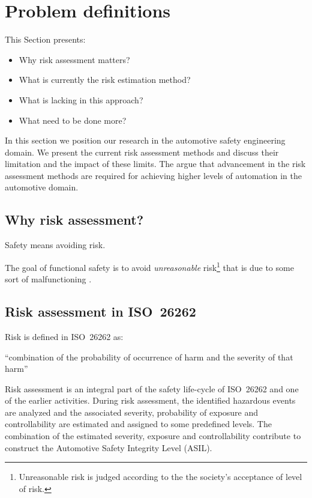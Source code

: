 \section{Problem definitions}
\label{sec:problem} %

This Section presents: 
\begin{itemize}
	\item Why risk assessment matters?
	\item What is currently the risk estimation method? 
	\item What is lacking in this approach? 
	\item What need to be done more? 
\end{itemize}

In this section we position our research in the automotive safety engineering domain. 
We present the current risk assessment methods and discuss their limitation and the impact of these limits.
The argue that advancement in the risk assessment methods are required for achieving higher levels of automation in the automotive domain. 

\subsection{Why risk assessment?}

Safety means avoiding risk. 

The goal of functional safety is to avoid \emph{unreasonable} risk\footnote{Unreasonable risk is judged according to the the society's acceptance of level of risk.} that is due to some sort of malfunctioning .


\subsection{Risk assessment in ISO~26262}
Risk is defined in ISO~26262 as:
\begin{definition}
	``combination of the probability of occurrence of harm and the severity of that harm'' 
\end{definition}



Risk assessment is an integral part of the safety life-cycle of ISO~26262 and one of the earlier activities. 
During risk assessment, the identified hazardous events are analyzed and the associated severity, probability of exposure and controllability are estimated and assigned to some predefined levels. 
The combination of the estimated severity, exposure and controllability contribute to construct the Automotive Safety Integrity Level (ASIL). 





